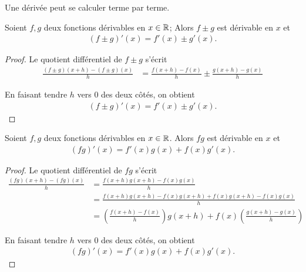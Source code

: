 \documentclass[main.tex]{subfiles}
\begin{document}
Une dérivée peut se calculer terme par terme.

\begin{proposition}

    Soient $f, g$ deux fonctions dérivables en $x \in \mathbb{R}$;
    Alors $f \pm g$ est dérivable en $x$ et
    \begin{align}
        (f \pm g)'(x) = f'(x) \pm g'(x).
    \end{align}
\end{proposition}
\begin{proof}
    Le quotient différentiel de $f \pm g$ s'écrit
    \begin{align}
        \frac {(f \pm g)(x + h) - (f \pm g)(x)} h
        &= \frac {f(x + h) - f(x)} h \pm \frac {g(x + h) - g(x)} h
    \end{align}

    En faisant tendre $h$ vers $0$ des deux côtés,
    on obtient
    \begin{align}
        (f \pm g)'(x) = f'(x) \pm g'(x).
    \end{align}
\end{proof}

\begin{proposition}

    Soient $f, g$ deux fonctions dérivables en $x \in \mathbb{R}$.
    Alors $f g$ est dérivable en $x$ et
    \begin{align}
        (f g)'(x) = f'(x) g(x) + f(x) g'(x).
    \end{align}
\end{proposition}
\begin{proof}
    Le quotient différentiel de $f g$ s'écrit
    \begin{align}
        \frac {(f g)(x + h) - (f g)(x)} h
        &= \frac {f(x + h) g(x + h) - f(x) g(x)} h\\
        &= \frac {f(x + h) g(x + h) - f(x) g(x + h) + f(x) g(x + h) - f(x) g(x)} h\\
        &= \left(\frac {f(x + h) - f(x)} h\right) g(x + h) + f(x) \left(\frac {g(x + h) - g(x)} h\right)
    \end{align}

    En faisant tendre $h$ vers $0$ des deux côtés,
    on obtient
    \begin{align}
        (f g)'(x) = f'(x) g(x) + f(x) g'(x).
    \end{align}
\end{proof}
\end{document}
